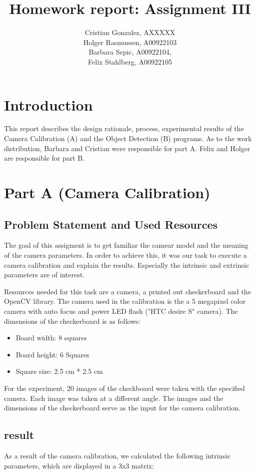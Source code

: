\documentclass[letter,12pt]{article}
\begin{document}
\title{Homework report: Assignment III}
\author{Cristian Gonzalez, AXXXXX\\
Holger Rasmussen, A00922103\\
Barbara Sepic, A00922104,\\
Felix Stahlberg, A00922105
}
\maketitle
\section{Introduction}
This report describes the design rationale, process, experimental results of the Camera Calibration (A) and the Object Detection (B) programs.   As to the work distribution, Barbara and Cristian were responsible for part A.  Felix and Holger are responsible for part B.  
\section{Part A (Camera Calibration)}
\subsection{Problem Statement and Used Resources}
The goal of this assigment is to get familiar the camear model and the meaning of the camera parameters.  In order to achieve this, it was our task to execute a camera calibration and explain the results.  Especially the intrinsic and extrinsic parameters are of interest. 

Resources needed for this task are a camera, a printed out checkerboard and the OpenCV library.  The camera used in the calibration is the a 5 megapixel color camera with auto focus and power LED flash ("HTC desire S" camera).  The dimensions of the checkerboard is as follows:
\begin{itemize}
	\item Board width: 8 squares
	\item Board height: 6 Squares
	\item Square size: 2.5 cm * 2.5 cm
\end{itemize}

For the experiment, 20 images of the checkboard were taken with the specified camera.  Each image was taken at a different angle.  The images and the dimensions of the checkerboard serve as the input for the camera calibration.
\subsection{result}
As a result of the camera calibration, we calculated the following intrinsic parameters, which are displayed in a 3x3 matrix:
\end{document}
